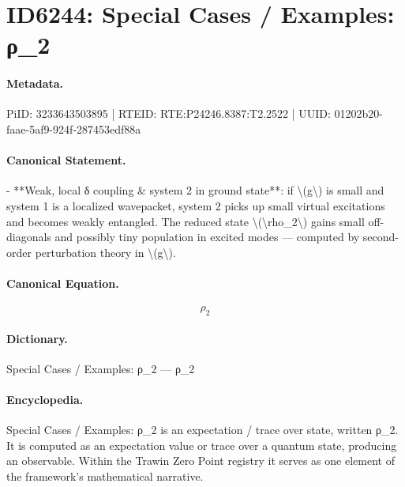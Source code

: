 \section*{ID6244: Special Cases / Examples: ρ\_2}
\paragraph{Metadata.}
PiID: 3233643503895 | RTEID: RTE:P24246.8387:T2.2522 | UUID: 01202b20-faae-5af9-924f-287453edf88a

\paragraph{Canonical Statement.}
- **Weak, local δ coupling \& system 2 in ground state**: if \textbackslash{}(g\textbackslash{}) is small and system 1 is a localized wavepacket, system 2 picks up small virtual excitations and becomes weakly entangled. The reduced state \textbackslash{}(\textbackslash{}rho\_2\textbackslash{}) gains small off-diagonals and possibly tiny population in excited modes — computed by second-order perturbation theory in \textbackslash{}(g\textbackslash{}).

\paragraph{Canonical Equation.}
\[
\rho_2
\]

\paragraph{Dictionary.}
Special Cases / Examples: ρ\_2 — ρ\_2

\paragraph{Encyclopedia.}
Special Cases / Examples: ρ\_2 is an expectation / trace over state, written ρ\_2. It is computed as an expectation value or trace over a quantum state, producing an observable. Within the Trawin Zero Point registry it serves as one element of the framework's mathematical narrative.
